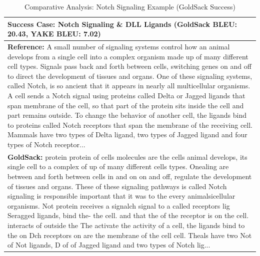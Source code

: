 

\begin{table}[htbp]
\centering
\small
\caption{Comparative Analysis: Notch Signaling Example (GoldSack Success)}
\label{tab:goldsack-success}
\begin{tabular}{|p{12cm}|}
\hline
\textbf{Success Case: Notch Signaling \& DLL Ligands (GoldSack BLEU: 20.43, YAKE BLEU: 7.02)} \\
\hline
\textbf{Reference:} A small number of signaling systems control how an animal develops from a single cell into a complex organism made up of many different cell types. Signals pass back and forth between cells, switching genes on and off to direct the development of tissues and organs. One of these signaling systems, called Notch, is so ancient that it appears in nearly all multicellular organisms. A cell sends a Notch signal using proteins called Delta or Jagged ligands that span membrane of the cell, so that part of the protein sits inside the cell and part remains outside. To change the behavior of another cell, the ligands bind to proteins called Notch receptors that span the membrane of the receiving cell. Mammals have two types of Delta ligand, two types of Jagged ligand and four types of Notch receptor... \\
\hline
\textbf{GoldSack:} \colorbox{red!20}{protein protein of cells} \colorbox{red!20}{molecules are the cells} animal develops, \colorbox{green!20}{its single cell to a complex} \colorbox{green!20}{of up of many different cells} \colorbox{green!20}{types}. \colorbox{green!20}{Onealing are between and} \colorbox{green!20}{forth between cells in and on} \colorbox{green!20}{on and off, regulate the} \colorbox{green!20}{development of tissues and} \colorbox{green!20}{organs}. \colorbox{green!20}{These of these signaling} \colorbox{green!20}{pathways is called Notch} \colorbox{green!20}{signaling is responsible} \colorbox{green!20}{important that it was to the} \colorbox{green!20}{every} animalsicellular organisms. \colorbox{green!20}{Not protein receives a} \colorbox{green!20}{signalch signal to a called} \colorbox{green!20}{receptors lig Seragged} \colorbox{green!20}{ligands}, bind the- the cell. and that the of the receptor is on the cell. interacts of outside the The activate the activity of a cell, \colorbox{green!20}{the ligands bind to the on} \colorbox{green!20}{Dch receptors on are the} \colorbox{green!20}{membrane of the cell cell}. Theals have two Not of Not ligands, D of of Jagged ligand and two types of Notch lig... \\

\end{tabular}
\end{table}
